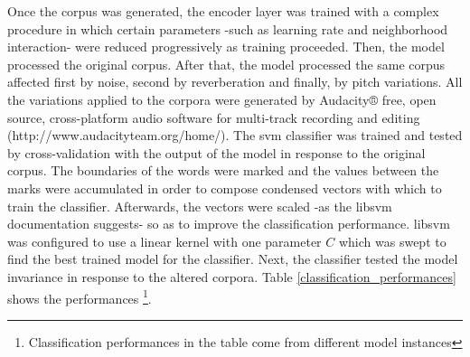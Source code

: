 \documentclass[11pt,a4paper]{article}
\begin{document}
Once the corpus was generated, the encoder layer was trained with a complex procedure
in which certain parameters -such as learning rate and neighborhood interaction- were
reduced progressively as training proceeded. 
Then, the model processed the original corpus.
After that, the model processed the same corpus affected first by noise,
second by reverberation and finally, by pitch variations.
All the variations applied to the corpora were generated by
Audacity® free, open source, cross-platform audio software for
multi-track recording and editing
(http://www.audacityteam.org/home/).
The \gls{svm} classifier was trained and tested by cross-validation
with the output of the model in response to the original corpus.
The boundaries of the words were marked and the values between the marks
were accumulated in order to compose condensed vectors with which to train
the classifier.
Afterwards, the vectors were scaled -as the \gls{libsvm} documentation suggests-
so as to improve the classification performance.
\gls{libsvm} was configured to use a linear kernel with one parameter $C$ which
was swept to find the best trained model for the classifier.
Next, the classifier tested the model invariance
in response to the altered corpora.
Table \ref{classification_performances} shows the performances
\footnote{Classification performances in the table come from different model instances}. \\




\end{document}
